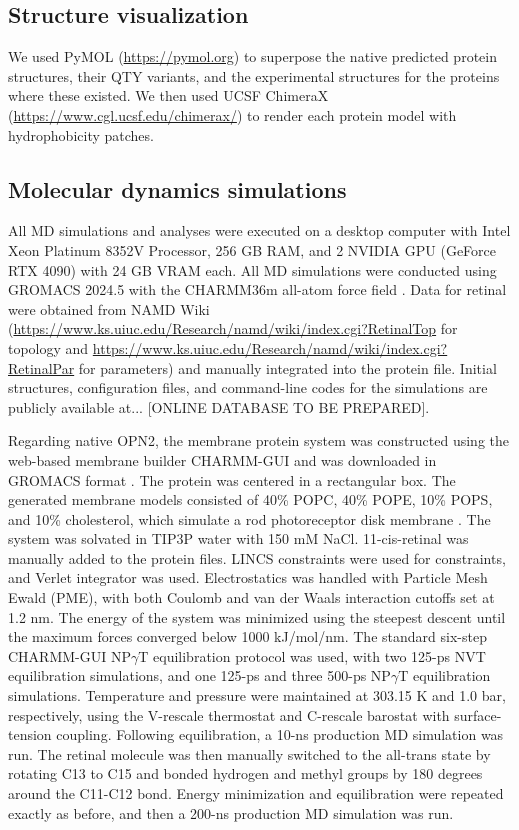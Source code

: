\documentclass[fleqn,10pt]{manuscript}
\begin{document}
\subsection*{Structure visualization}

We used PyMOL (\url{https://pymol.org}) to superpose the native predicted protein structures, their QTY variants, and the experimental structures for the proteins where these existed. We then used UCSF ChimeraX (\url{https://www.cgl.ucsf.edu/chimerax/}) to render each protein model with hydrophobicity patches.  

\subsection*{Molecular dynamics simulations}

All MD simulations and analyses were executed on a desktop computer with Intel Xeon Platinum 8352V Processor, 256 GB RAM, and 2 NVIDIA GPU (GeForce RTX 4090) with 24 GB VRAM each. All MD simulations were conducted using GROMACS 2024.5 \citep{Abraham_2015} with the CHARMM36m all-atom force field \citep{Huang_2017}. Data for retinal were obtained from NAMD Wiki (\url{https://www.ks.uiuc.edu/Research/namd/wiki/index.cgi?RetinalTop} for topology and \url{https://www.ks.uiuc.edu/Research/namd/wiki/index.cgi?RetinalPar} for parameters) and manually integrated into the protein file. Initial structures, configuration files, and command-line codes for the simulations are publicly available at... [ONLINE DATABASE TO BE PREPARED]. 

Regarding native OPN2, the membrane protein system was constructed using the web-based membrane builder CHARMM-GUI and was downloaded in GROMACS format \citep{Jo_2008, Wu_2014, Lee_2016}. The protein was centered in a rectangular box. The generated membrane models consisted of 40\% POPC, 40\% POPE, 10\% POPS, and 10\% cholesterol, which simulate a rod photoreceptor disk membrane \citep{Albert_2005}. The system was solvated in TIP3P water with 150 mM NaCl. 11-cis-retinal was manually added to the protein files. LINCS constraints were used for constraints, and Verlet integrator was used. Electrostatics was handled with Particle Mesh Ewald (PME), with both Coulomb and van der Waals interaction cutoffs set at 1.2 nm. The energy of the system was minimized using the steepest descent until the maximum forces converged below 1000 kJ/mol/nm. The standard six-step CHARMM-GUI NP$\gamma$T equilibration protocol \citep{Jo_2008} was used, with two 125-ps NVT equilibration simulations, and one 125-ps and three 500-ps NP$\gamma$T equilibration simulations. Temperature and pressure were maintained at 303.15 K and 1.0 bar, respectively, using the V-rescale thermostat and C-rescale barostat with surface-tension coupling. Following equilibration, a 10-ns production MD simulation was run. The retinal molecule was then manually switched to the all-trans state by rotating C13 to C15 and bonded hydrogen and methyl groups by 180 degrees around the C11-C12 bond. Energy minimization and equilibration were repeated exactly as before, and then a 200-ns production MD simulation was run. 
\end{document}
